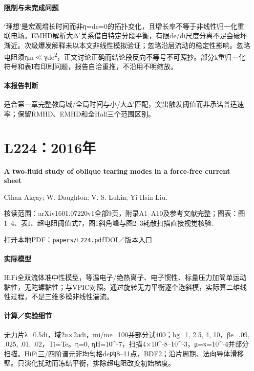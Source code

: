 \paragraph{限制与未完成问题}‘理想’是宏观增长时间而非η=de=0的拓扑变化，且增长率不等于非线性归一化重联电场。EMHD解析大Δ'关系借自特定分段平衡，有限de/di尺度分离不足会破坏渐近。次级爆发解释未以本文非线性模拟验证；忽略沿层流动的稳定性影响。忽略电阻须ηm\ensuremath{\ll}γde\textsuperscript{2}，正文讨论正确而结论段反向不等号不可照抄。部分k重归一化符号和表I有印刷问题，报告自洽重推，不沿用不明缩放。

\paragraph{本报告判断}适合第一章完整教局域/全局时间与小/大Δ'匹配，突出触发阈值而非承诺普适速率；保留RMHD、EMHD和全Hall三个范围区别。

\section{L224：2016年}\label{paper:L224}

\textbf{A two-fluid study of oblique tearing modes in a force-free current sheet}\citep{L224}\

Cihan Akçay;  W. Daughton;  V. S. Lukin;  Yi-Hsin Liu.

\textsf{核读范围：}arXiv1601.07220v1全部9页，附录A1–A10及参考文献完整；\textsf{图表：}图1–4、表I、超电阻阈值式7，图1斜角峰与图2–3耗散扫描直接视觉核验.

\href{run:papers/L224.pdf}{打开本地PDF：\texttt{papers/L224.pdf}}\quad\href{https://doi.org/10.1063/1.4940945}{DOI／版本入口}

\paragraph{实际模型}HiFi全双流体准中性模型，等温电子/绝热离子、电子惯性、标量压力加简单运动黏性，无陀螺黏性；与VPIC对照。通过旋转无力平衡逐个选斜模，实际算二维线性过程，不是三维多模非线性湍流。

\paragraph{计算／实验细节}无力片λ=0.5di，域2π×2πdi，mi/me=100并部分试400；bg=1, 2.5, 4, 10，βe=.09, .025, .01, .02，Ti=Te。η=0, ηH=10\textasciicircum{}-7，扫描4×10\textasciicircum{}-8–10\textasciicircum{}-3，μ=κ=10\textasciicircum{}-4并部分扫描。HiFi三/四阶谱元非均匀格de内8–11点，BDF2；沿片周期、法向导体滑移壁。只演化扰动而冻结平衡，排除超电阻改变初始梯度。

